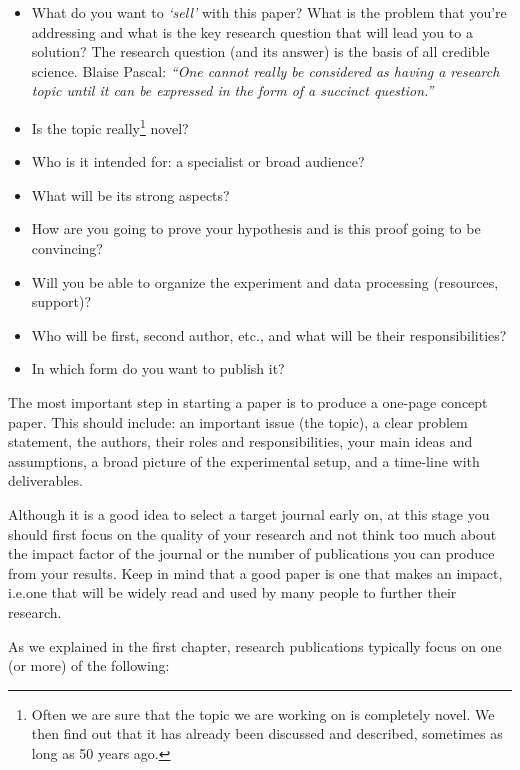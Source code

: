 \documentclass[graybox,envcountchap,sectrefs,UStrade]{svmono}
\begin{document}
\begin{itemize}\renewcommand{\labelitemi}{$\checkmark$}
 \item What do you want to \emph{`sell'} with this paper? What is the problem that you're addressing and what is the key research question that will lead you to a solution? The research question (and its answer) is the basis of all credible science. Blaise Pascal: \emph{``One cannot really be considered as having a research topic until it can be expressed in the form of a succinct question.''}
 \item Is the topic really\footnote{Often we are sure that the topic we are working on is completely novel. We then find out that it has already been discussed and described, sometimes as long as 50 years ago.} novel?
 \item Who is it intended for: a specialist or broad audience?
 \item What will be its strong aspects?
 \item How are you going to prove your hypothesis and is this proof going to be convincing?
 \item Will you be able to organize the experiment and data processing (resources, support)?
 \item Who will be first, second author, etc., and what will be their responsibilities?
 \item In which form do you want to publish it?
\end{itemize}

\begin{svgraybox}
The most important step in starting a paper is to produce a one-page concept paper. This should include: an important issue (the topic), a clear problem statement, the authors, their roles and responsibilities, your main ideas and assumptions, a broad picture of the experimental setup, and a time-line with deliverables.
\end{svgraybox}

Although it is a good idea to select a target journal early on, at this stage you should first focus on the quality of your research and not think too much about the impact factor of the journal or the number of publications you can produce from your results. Keep in mind that a good paper is one that makes an impact, i.e.\@ one that will be widely read and used by many people to further their research.  \par

As we explained in the first chapter, research publications typically focus on one (or more) of the following:
\end{document}
